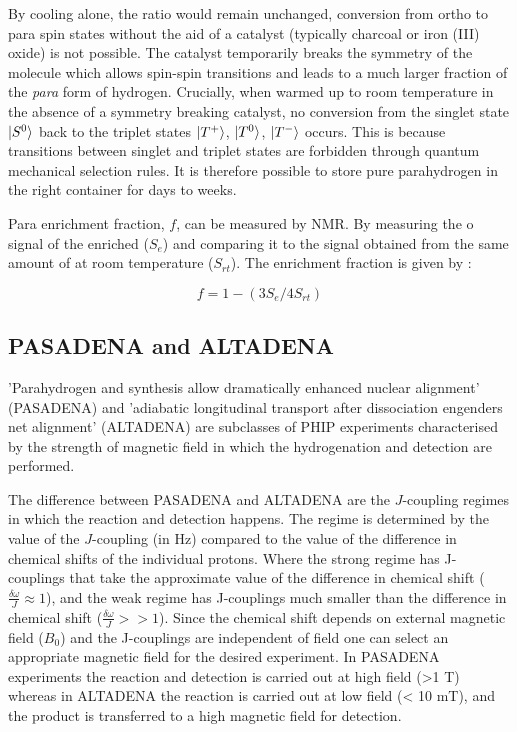  By cooling alone, the ratio would remain unchanged, conversion
 from ortho to para spin states without the aid of a catalyst (typically charcoal or iron (III) oxide) is not possible.
 The catalyst temporarily breaks the symmetry of the  molecule which allows spin-spin transitions and leads to
 a much larger fraction of the \textit{para} form of hydrogen. Crucially, when warmed up to
 room temperature in the absence of a symmetry breaking catalyst, no conversion from the singlet state $\ket{S^0}$ back to
 the triplet states $\ket{T^+}$, $\ket{T^0}$, $\ket{T^-}$ occurs. This is because transitions between singlet and triplet states
 are forbidden through quantum mechanical selection rules. It is therefore possible to store pure parahydrogen
 in the right container for days to weeks.

 Para enrichment fraction, $f$, can be measured by NMR. By measuring the o signal of the enriched  ($S_{e}$)
 and comparing it to the signal obtained from the same amount of  at room temperature ($S_{rt}$).
 The enrichment fraction is given by \citep{RN131, RN132}:

 \begin{equation}\label{pfrac}
   f = 1 -(3S_{e}/4S_{rt})
 \end{equation}

 \subsection{PASADENA and ALTADENA}\label{PASADENA and ALTADENA}

 'Parahydrogen and synthesis allow dramatically enhanced nuclear alignment' (PASADENA)\citep{RN129} and 'adiabatic longitudinal
 transport after dissociation engenders net alignment' (ALTADENA)\citep{RN128}
 are subclasses of PHIP experiments characterised by the strength of magnetic
 field in which the hydrogenation and detection are performed.

 The difference between PASADENA and ALTADENA are the $J$-coupling regimes in which the reaction and detection happens.
 The regime is determined by the value of the $J$-coupling (in Hz) compared to the value of the difference in chemical
 shifts of the individual protons. Where the strong regime has J-couplings that take the approximate value of the difference in chemical shift
 ($\frac{\delta{\omega}}{J}\approx1$), and the weak regime has J-couplings much smaller than the difference in chemical
 shift ($\frac{\delta{\omega}}{J}>>1$). Since the chemical shift depends on external magnetic field ($B_{0}$) and the
 J-couplings are independent of field one can select an appropriate magnetic field for the desired experiment.
 In PASADENA experiments the reaction and detection is carried out at high field (>1 T) whereas in
 ALTADENA the reaction is carried out at low field (< 10 mT), and the product is transferred to a high magnetic field for detection\citep{RN130}.

